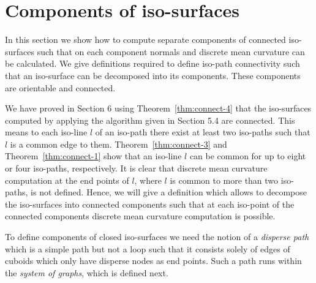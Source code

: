 \documentclass[a4paper,11pt]{article}
\begin{document}
\section{Components of iso-surfaces}
In this section we show how to compute separate components of connected iso-surfaces such that
on each component normals and discrete mean curvature can be calculated. We give definitions required to define
iso-path connectivity such that an iso-surface can be decomposed into its components. These components
are orientable and connected.

We have proved in Section 6 using Theorem~\ref{thm:connect-4} that the iso-surfaces computed by
applying the algorithm given in Section 5.4 are connected. This means to each iso-line $l$ of
an iso-path there exist at least two iso-paths such that $l$ is a common edge to them.
Theorem~\ref{thm:connect-3} and Theorem~\ref{thm:connect-1} show that an iso-line $l$ can be
common for up to eight or four iso-paths, respectively. It is clear that discrete mean curvature
computation at the end points of $l$, where $l$ is common to more than two iso-paths, is not defined.
Hence, we will give a definition which allows to decompose the iso-surfaces into connected components
such that at each iso-point of the connected components discrete mean curvature computation is possible.

To define components of closed iso-surfaces we need the notion of a {\it disperse path} which is a simple
path but not a loop such that it consists solely of edges of cuboids which only have disperse nodes as
end points. Such a path runs within the {\it system of graphs}, which is defined next.
\end{document}
